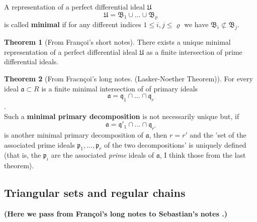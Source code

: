 \documentclass{article}
\theoremstyle{definition}
\newtheorem{thm}{Theorem}
\begin{document}
A representation of a perfect differential ideal $\mathfrak U$
$$
\mathfrak U=\mathfrak B_1\cup...\cup\mathfrak B_\varrho$$
is called \textbf{minimal} if for any different indices $1\leq i,j\leq\varrho$ we have $\mathfrak B_i\not\subset\mathfrak B_j$.
\begin{thm}[From Françoi's short notes]
    There exists a unique minimal representation of a perfect differential ideal $\mathfrak U$ as a finite intersection of prime differential ideals.
\end{thm}
\begin{thm}[From Fracnçoi's long notes. (Lasker-Noether Theorem)]
For every ideal $\mathfrak a\subset R$ is a finite minimal intersection of of primary ideals $$\mathfrak a=\mathfrak q_1\cap ...\cap \mathfrak q_r$$.\\ Such a \textbf{minimal primary decomposition} is not necessarily unique but, if $$\mathfrak a=\mathfrak q'_1\cap...\cap\mathfrak q_{r'}$$ is another minimal primary decomposition of $\mathfrak a$, then $r=r'$ and the 'set of the associated prime ideals $\mathfrak p_1,...,\mathfrak p_r$ of the two decompositions' is uniquely defined (that is, the $\mathfrak p_i$ are the associated \textit{prime} ideals of $\mathfrak a$, I think those from the last theorem).
    
\end{thm}
\subsection{Triangular sets and regular chains}
\textbf{(Here we pass from Françoi's long notes \cite{Francois} to Sebastian's notes \cite{Sebastian}.)}\par
\end{document}
